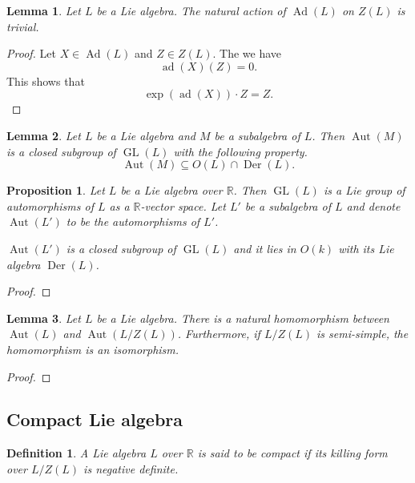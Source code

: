 \documentclass{article}
\newtheorem{proposition}{Proposition}[section]
\newtheorem{definition}{Definition}[section]
\newtheorem{lemma}{Lemma}[section]
\numberwithin{equation}{section}
\DeclareMathOperator{\Ad}{Ad}
\DeclareMathOperator{\ad}{ad}
\DeclareMathOperator{\GL}{GL}
\DeclareMathOperator{\Der}{Der}
\DeclareMathOperator{\Aut}{Aut}
\begin{document}
\begin{lemma}
Let $L$ be a Lie algebra. The natural action of $\Ad(L)$ on $Z(L)$ is trivial.
\end{lemma}

\begin{proof}
Let $X\in\Ad(L)$ and $Z\in Z(L)$. The we have
\begin{equation*}
\ad(X)(Z) = 0.
\end{equation*}
This shows that 
\begin{equation*}
\exp(\ad(X))\cdot Z = Z.
\end{equation*}
\end{proof}

\begin{lemma}
Let $L$ be a Lie algebra and $M$ be a subalgebra of $L$. Then $\Aut(M)$ is a closed subgroup of $\GL(L)$ with the following property.
\begin{equation*}
\Aut(M)\subseteq O(L)\cap \Der(L).
\end{equation*}
\end{lemma}

\begin{proposition}
Let $L$ be a Lie algebra over $\mathbb{R}$. Then $\GL(L)$ is a Lie group of automorphisms of $L$ as a $\mathbb{R}$-vector space. Let $L'$ be a subalgebra of $L$ and denote $\Aut(L')$ to be the automorphisms of $L'$.\\
\par $\Aut(L')$ is a closed subgroup of $\GL(L)$ and it lies in $O(k)$ with its Lie algebra $\Der(L)$.
\end{proposition}

\begin{proof}
\end{proof}

\begin{lemma}
Let $L$ be a Lie algebra. There is a natural homomorphism between $\Aut(L)$ and $\Aut(L/Z(L))$. Furthermore, if $L/Z(L)$ is semi-simple, the homomorphism is an isomorphism.
\end{lemma}

\begin{proof}
\end{proof}

\subsection{Compact Lie algebra}

\begin{definition}
A Lie algebra $L$ over $\mathbb{R}$ is said to be compact if its killing form over $L/Z(L)$ is negative definite.
\end{definition}
\end{document}
